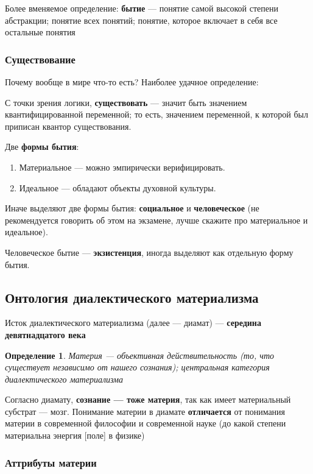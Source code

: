 \documentclass{article}
\newtheorem{definition}{Определение}
\begin{document}
\begin{flushleft}
Более вменяемое определение: \textbf{бытие} — понятие самой высокой степени абстракции; понятие всех понятий; понятие, которое включает в себя все остальные понятия

\subsubsection{Существование}

Почему вообще в мире что-то есть? Наиболее удачное определение:

С точки зрения логики, \textbf{существовать} — значит быть значением квантифицированной переменной; то есть, значением переменной, к которой был приписан квантор существования.

Две \textbf{формы бытия}:

\begin{enumerate}
    \item Материальное — можно эмпирически верифицировать.
    \item Идеальное — обладают объекты духовной культуры.
\end{enumerate}

Иначе выделяют две формы бытия: \textbf{социальное} и \textbf{человеческое} (не рекомендуется говорить об этом на экзамене, лучше скажите про материальное и идеальное).

Человеческое бытие — \textbf{экзистенция}, иногда выделяют как отдельную форму бытия.

\subsection{Онтология диалектического материализма}

Исток диалектического материализма (далее — диамат) — \textbf{середина девятнадцатого века}

\begin{definition}
    Материя — объективная действительность (то, что существует независимо от нашего сознания); центральная категория диалектического материализма
\end{definition}

Согласно диамату, \textbf{сознание — тоже материя}, так как имеет материальный субстрат — мозг. Понимание материи в диамате \textbf{отличается} от понимания материи в современной философии и современной науке (до какой степени материальна энергия [поле] в физике)

\subsubsection{Аттрибуты материи}


\end{flushleft}
\end{document}
